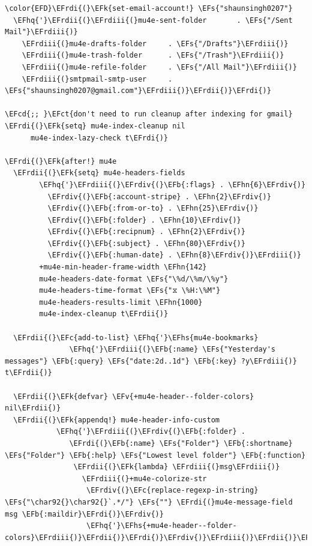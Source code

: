 \documentclass{scrartcl}
\newcommand{\EFk}[1]{\textcolor{EFk}{#1}} %
\newcommand{\EFs}[1]{\textcolor{EFs}{#1}} %
\newcommand{\EFb}[1]{\textcolor{EFb}{#1}} %
\newcommand{\EFct}[1]{\textcolor{EFct}{#1}} %
\newcommand{\EFc}[1]{\textcolor{EFc}{#1}} %
\newcommand{\EFv}[1]{\textcolor{EFv}{#1}} %
\newcommand{\EFcd}[1]{\textcolor{EFcd}{#1}} %
\newcommand{\EFhn}[1]{#1} %
\newcommand{\EFhq}[1]{#1} %
\newcommand{\EFhs}[1]{#1} %
\newcommand{\EFrdi}[1]{#1} %
\newcommand{\EFrdii}[1]{#1} %
\newcommand{\EFrdiii}[1]{#1} %
\newcommand{\EFrdiv}[1]{#1} %
\begin{document}
\begin{Code}
\begin{Verbatim}[]
\color{EFD}\EFrdi{(}\EFk{set-email-account!} \EFs{"shaunsingh0207"}
  \EFhq{'}\EFrdii{(}\EFrdiii{(}mu4e-sent-folder       . \EFs{"/Sent Mail"}\EFrdiii{)}
    \EFrdiii{(}mu4e-drafts-folder     . \EFs{"/Drafts"}\EFrdiii{)}
    \EFrdiii{(}mu4e-trash-folder      . \EFs{"/Trash"}\EFrdiii{)}
    \EFrdiii{(}mu4e-refile-folder     . \EFs{"/All Mail"}\EFrdiii{)}
    \EFrdiii{(}smtpmail-smtp-user     . \EFs{"shaunsingh0207@gmail.com"}\EFrdiii{)}\EFrdii{)}\EFrdi{)}

\EFcd{;; }\EFct{don't need to run cleanup after indexing for gmail}
\EFrdi{(}\EFk{setq} mu4e-index-cleanup nil
      mu4e-index-lazy-check t\EFrdi{)}

\EFrdi{(}\EFk{after!} mu4e
  \EFrdii{(}\EFk{setq} mu4e-headers-fields
        \EFhq{'}\EFrdiii{(}\EFrdiv{(}\EFb{:flags} . \EFhn{6}\EFrdiv{)}
          \EFrdiv{(}\EFb{:account-stripe} . \EFhn{2}\EFrdiv{)}
          \EFrdiv{(}\EFb{:from-or-to} . \EFhn{25}\EFrdiv{)}
          \EFrdiv{(}\EFb{:folder} . \EFhn{10}\EFrdiv{)}
          \EFrdiv{(}\EFb{:recipnum} . \EFhn{2}\EFrdiv{)}
          \EFrdiv{(}\EFb{:subject} . \EFhn{80}\EFrdiv{)}
          \EFrdiv{(}\EFb{:human-date} . \EFhn{8}\EFrdiv{)}\EFrdiii{)}
        +mu4e-min-header-frame-width \EFhn{142}
        mu4e-headers-date-format \EFs{"\%d/\%m/\%y"}
        mu4e-headers-time-format \EFs{"⧖ \%H:\%M"}
        mu4e-headers-results-limit \EFhn{1000}
        mu4e-index-cleanup t\EFrdii{)}

  \EFrdii{(}\EFc{add-to-list} \EFhq{'}\EFhs{mu4e-bookmarks}
               \EFhq{'}\EFrdiii{(}\EFb{:name} \EFs{"Yesterday's messages"} \EFb{:query} \EFs{"date:2d..1d"} \EFb{:key} ?y\EFrdiii{)} t\EFrdii{)}

  \EFrdii{(}\EFk{defvar} \EFv{+mu4e-header--folder-colors} nil\EFrdii{)}
  \EFrdii{(}\EFk{appendq!} mu4e-header-info-custom
            \EFhq{'}\EFrdiii{(}\EFrdiv{(}\EFb{:folder} .
               \EFrdi{(}\EFb{:name} \EFs{"Folder"} \EFb{:shortname} \EFs{"Folder"} \EFb{:help} \EFs{"Lowest level folder"} \EFb{:function}
                \EFrdii{(}\EFk{lambda} \EFrdiii{(}msg\EFrdiii{)}
                  \EFrdiii{(}+mu4e-colorize-str
                   \EFrdiv{(}\EFc{replace-regexp-in-string} \EFs{"\char92{}\char92{}`.*/"} \EFs{""} \EFrdi{(}mu4e-message-field msg \EFb{:maildir}\EFrdi{)}\EFrdiv{)}
                   \EFhq{'}\EFhs{+mu4e-header--folder-colors}\EFrdiii{)}\EFrdii{)}\EFrdi{)}\EFrdiv{)}\EFrdiii{)}\EFrdii{)}\EFrdi{)}
\end{Verbatim}
\end{Code}
\end{document}
